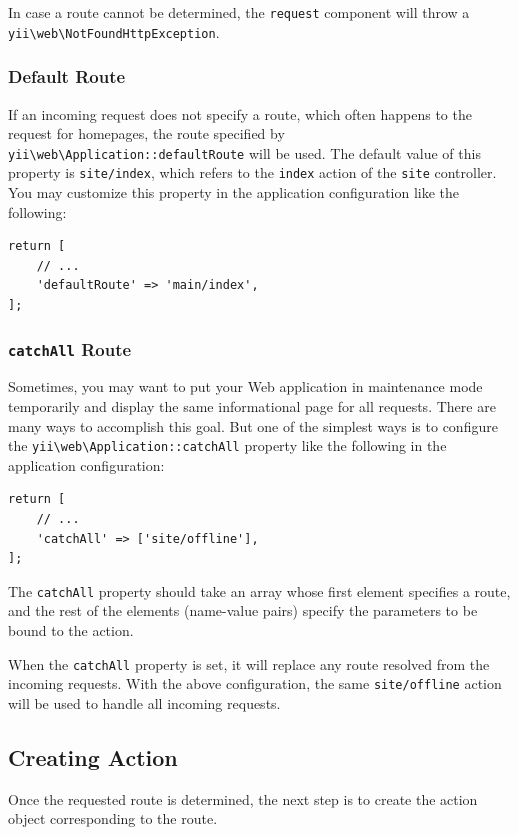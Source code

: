 In case a route cannot be determined, the \lstinline|request| component will throw a \texttt{yii{\allowbreak{}\textbackslash}web{\allowbreak{}\textbackslash}NotFoundHttpException}.

\subsubsection{Default Route \label{runtime-routing.md::default-route}}
If an incoming request does not specify a route, which often happens to the request for homepages,
the route specified by \texttt{yii{\allowbreak{}\textbackslash}web{\allowbreak{}\textbackslash}Application\allowbreak{}::\allowbreak{}defaultRoute} will be used. The default value of this property
is \lstinline|site/index|, which refers to the \lstinline|index| action of the \lstinline|site| controller. You may customize this property
in the application configuration like the following:

\lstset{language=php}\begin{lstlisting}
return [
    // ...
    'defaultRoute' => 'main/index',
];
\end{lstlisting}
\subsubsection{\lstinline|catchAll| Route \label{runtime-routing.md::catchall-route}}
Sometimes, you may want to put your Web application in maintenance mode temporarily and display the same
informational page for all requests. There are many ways to accomplish this goal. But one of the simplest
ways is to configure the \texttt{yii{\allowbreak{}\textbackslash}web{\allowbreak{}\textbackslash}Application\allowbreak{}::\allowbreak{}catchAll} property like the following in the application configuration:

\lstset{language=php}\begin{lstlisting}
return [
    // ...
    'catchAll' => ['site/offline'],
];
\end{lstlisting}
The \lstinline|catchAll| property should take an array whose first element specifies a route, and
the rest of the elements (name-value pairs) specify the parameters to be bound to the action.

When the \lstinline|catchAll| property is set, it will replace any route resolved from the incoming requests.
With the above configuration, the same \lstinline|site/offline| action will be used to handle all incoming requests.

\subsection{Creating Action \label{runtime-routing.md::creating-action}}
Once the requested route is determined, the next step is to create the action object corresponding to the route.

